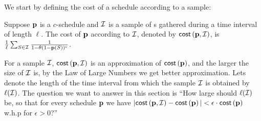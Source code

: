 	We start by defining the cost of a schedule according to a sample:
	\begin{definition}
	Suppose $\mathbf{p}$ is a $c$-schedule and $\mathcal{I}$ is a sample of {\ins}s gathered during a time interval of length $\ell$. The cost of $\mathbf{p}$ according to $\mathcal{I}$, denoted by $\mathsf{cost}\left( \mathbf{p},\mathcal{I} \right)$, is
	$\frac{1}{\ell}\sum_{S\in \mathcal{I}} \frac{1}{1-\theta(1-\mathbf{p}(S))^c}$.
	\end{definition}
	For a sample $\mathcal{I}$, $\mathsf{cost}\left( \mathbf{p},\mathcal{I} \right)$ is an approximation of $\mathsf{cost}\left( \mathbf{p} \right)$, and the larger the size of $\mathcal{I}$ is, by the Law of Large Numbers we get better approximation. Lets denote the length of the time interval from which the sample $\mathcal{I}$ is obtained by $\ell(\mathcal{I})$. The question we want to answer in this section is ``How large should $\ell(\mathcal{I})$ be, so that for every schedule $\mathbf{p}$ we have $|\mathsf{cost}\left( \mathbf{p},\mathcal{I} \right) - \mathsf{cost}\left( \mathbf{p} \right)| < \epsilon\cdot\mathsf{cost}\left( \mathbf{p} \right)$ w.h.p for $\epsilon > 0$?''

